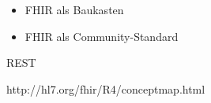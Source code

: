 \begin{comment}
 

 

   

 

 

Tab. 1 Beispicle fiir in FHIR definierte Ressourcentypen Quelle: HL7 International: FHIR Spezi-
fikation Version 4.0.1.: Ressourcentypen. http:/hI7.org/fhir/resourcelist. html
‘Name des

 

 

 

 

Bereich
Patient ‘Name, Geburisdatum, Adresse, Gesel ‘Administration
Encounter Datum und Dauer des Aufenthaltes, aang it ‘Administration
(stationiir/ambulant), verantwortliche Organisation, Ort
(Station, Zimmer, Bettplatz)
Condition Diagnose-Code (z. B. ICD-10), Diagnosedatum, Klinik

  

Schweregrad, Klinischer Status (gesichert/Verdacht)

Observation Durchgefihrte Messung (zB. Klinisehe Chemie, Fieber, Diagnostik
Puls, Blutdruck), Messergebnis, verwendetes Geri,
Zeitpunkt der Messung, Normbereich

 

Chargtiem erbrache Leising, Unfan, ZipunkVZsivaum, Anahi, | Abrechoung
s, Zu-/Abschkig
‘AuditEvent zion = Duco, ‘Art und Umfang des Zugriffes, | Sicherheit

 

ire-Komponenten bzw. Benutzer
ResearchSubject Nevtnupfong ces die,
Zaire ee etinchos,zugewicocerStudicaaen, ets

Einwilligungen

    

Forschung


\end{comment}

\begin{itemize}
\item FHIR als Baukasten
\item FHIR als Community-Standard
\end{itemize}


REST \cite{rest-fielding}


http://hl7.org/fhir/R4/conceptmap.html

